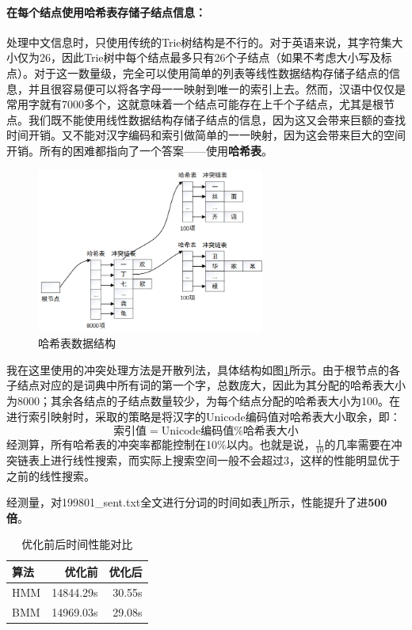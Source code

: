\documentclass[11pt,a4paper]{article}
\begin{document}
	\paragraph{在每个结点使用哈希表存储子结点信息：}处理中文信息时，只使用传统的Trie树结构是不行的。对于英语来说，其字符集大小仅为26，因此Trie树中每个结点最多只有26个子结点（如果不考虑大小写及标点）。对于这一数量级，完全可以使用简单的列表等线性数据结构存储子结点的信息，并且很容易便可以将各字母一一映射到唯一的索引上去。然而，汉语中仅仅是常用字就有7000多个，这就意味着一个结点可能存在上千个子结点，尤其是根节点。我们既不能使用线性数据结构存储子结点的信息，因为这又会带来巨额的查找时间开销。又不能对汉字编码和索引做简单的一一映射，因为这会带来巨大的空间开销。所有的困难都指向了一个答案——使用{\bfseries 哈希表}。
	
	\begin{figure}[htbp]
		\centering
		\includegraphics[width=7.5cm]{hash.png}
		\caption{哈希表数据结构}\label{hash}
	\end{figure}
	
	我在这里使用的冲突处理方法是开散列法，具体结构如图\ref{hash}所示。由于根节点的各子结点对应的是词典中所有词的第一个字，总数庞大，因此为其分配的哈希表大小为8000；其余各结点的子结点数量较少，为每个结点分配的哈希表大小为100。在进行索引映射时，采取的策略是将汉字的Unicode编码值对哈希表大小取余，即：
	\begin{equation}
		\mbox{索引值}=\mbox{Unicode编码值}\%\mbox{哈希表大小}
	\end{equation}
	\noindent 经测算，所有哈希表的冲突率都能控制在10\%以内。也就是说，$\frac{1}{10}$的几率需要在冲突链表上进行线性搜索，而实际上搜索空间一般不会超过3，这样的性能明显优于之前的线性搜索。
	
	经测量，对199801\_sent.txt全文进行分词的时间如表\ref{time_table}所示，性能提升了进{\bfseries 500倍}。
	\begin{table}[htbp]
		\centering
		\begin{tabular}{lrr}
			\hline \textbf{算法} & \textbf{优化前} & \textbf{优化后}\\ \hline
			HMM & 14844.29s & 30.55s\\
			BMM & 14969.03s & 29.08s\\
			\hline
		\end{tabular}
		\caption{\label{time_table} 优化前后时间性能对比 }
	\end{table}
\end{document}
